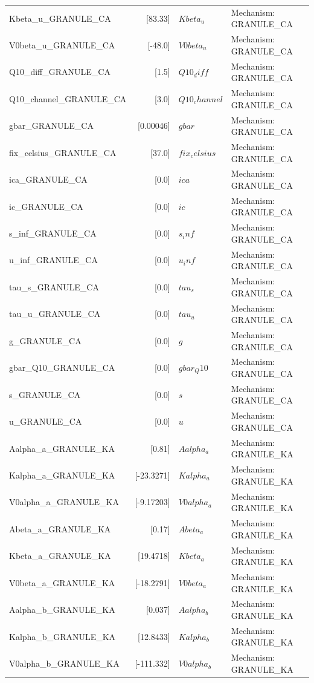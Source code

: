\begin{tabular}{|l|r|l|l|}
Kbeta_u_GRANULE_CA & [83.33] & $Kbeta_u$ & Mechanism: GRANULE_CA \\
V0beta_u_GRANULE_CA & [-48.0] & $V0beta_u$ & Mechanism: GRANULE_CA \\
Q10_diff_GRANULE_CA & [1.5] & $Q10_diff$ & Mechanism: GRANULE_CA \\
Q10_channel_GRANULE_CA & [3.0] & $Q10_channel$ & Mechanism: GRANULE_CA \\
gbar_GRANULE_CA & [0.00046] & $gbar$ & Mechanism: GRANULE_CA \\
fix_celsius_GRANULE_CA & [37.0] & $fix_celsius$ & Mechanism: GRANULE_CA \\
ica_GRANULE_CA & [0.0] & $ica$ & Mechanism: GRANULE_CA \\
ic_GRANULE_CA & [0.0] & $ic$ & Mechanism: GRANULE_CA \\
s_inf_GRANULE_CA & [0.0] & $s_inf$ & Mechanism: GRANULE_CA \\
u_inf_GRANULE_CA & [0.0] & $u_inf$ & Mechanism: GRANULE_CA \\
tau_s_GRANULE_CA & [0.0] & $tau_s$ & Mechanism: GRANULE_CA \\
tau_u_GRANULE_CA & [0.0] & $tau_u$ & Mechanism: GRANULE_CA \\
g_GRANULE_CA & [0.0] & $g$ & Mechanism: GRANULE_CA \\
gbar_Q10_GRANULE_CA & [0.0] & $gbar_Q10$ & Mechanism: GRANULE_CA \\
s_GRANULE_CA & [0.0] & $s$ & Mechanism: GRANULE_CA \\
u_GRANULE_CA & [0.0] & $u$ & Mechanism: GRANULE_CA \\
Aalpha_a_GRANULE_KA & [0.81] & $Aalpha_a$ & Mechanism: GRANULE_KA \\
Kalpha_a_GRANULE_KA & [-23.3271] & $Kalpha_a$ & Mechanism: GRANULE_KA \\
V0alpha_a_GRANULE_KA & [-9.17203] & $V0alpha_a$ & Mechanism: GRANULE_KA \\
Abeta_a_GRANULE_KA & [0.17] & $Abeta_a$ & Mechanism: GRANULE_KA \\
Kbeta_a_GRANULE_KA & [19.4718] & $Kbeta_a$ & Mechanism: GRANULE_KA \\
V0beta_a_GRANULE_KA & [-18.2791] & $V0beta_a$ & Mechanism: GRANULE_KA \\
Aalpha_b_GRANULE_KA & [0.037] & $Aalpha_b$ & Mechanism: GRANULE_KA \\
Kalpha_b_GRANULE_KA & [12.8433] & $Kalpha_b$ & Mechanism: GRANULE_KA \\
V0alpha_b_GRANULE_KA & [-111.332] & $V0alpha_b$ & Mechanism: GRANULE_KA \\

\end{tabular}
